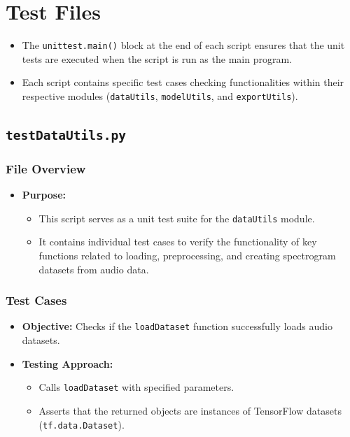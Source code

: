 \section{Test Files}



\begin{itemize}
	\item The \texttt{unittest.main()} block at the end of each script ensures that the unit tests are executed when the script is run as the main program.
	\item Each script contains specific test cases checking functionalities within their respective modules (\texttt{dataUtils}, \texttt{modelUtils}, and \texttt{exportUtils}).
\end{itemize}


\subsection{\texttt{testDataUtils.py}}

\subsubsection{File Overview}

\begin{itemize}
	\item \textbf{Purpose:}
	\begin{itemize}
		\item This script serves as a unit test suite for the \texttt{dataUtils} module.
		\item It contains individual test cases to verify the functionality of key functions related to loading, preprocessing, and creating spectrogram datasets from audio data.
	\end{itemize}
\end{itemize}

\subsubsection{Test Cases}

\textbf{}

\begin{itemize}
	\item \textbf{Objective:} Checks if the \texttt{loadDataset} function successfully loads audio datasets.
	\item \textbf{Testing Approach:}
	\begin{itemize}
		\item Calls \texttt{loadDataset} with specified parameters.
		\item Asserts that the returned objects are instances of TensorFlow datasets (\texttt{tf.data.Dataset}).
	\end{itemize}
\end{itemize}

